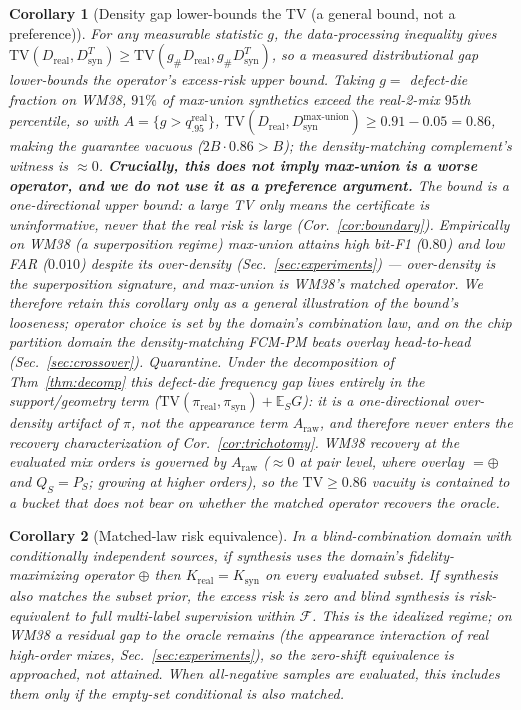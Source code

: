\documentclass[11pt]{article}
\newtheorem{corollary}{Corollary}
\begin{document}
\begin{corollary}[Density gap lower-bounds the TV (a general bound, not a
preference)]\label{cor:density}
For any measurable statistic $g$, the data-processing inequality gives
$\mathrm{TV}(D_{\mathrm{real}},D_{\mathrm{syn}}^{T})\ge
\mathrm{TV}(g_\#D_{\mathrm{real}},g_\#D_{\mathrm{syn}}^{T})$, so a measured
distributional gap \emph{lower-bounds} the operator's excess-risk \emph{upper
bound}. Taking $g=$ defect-die fraction on WM38, $91\%$ of max-union synthetics
exceed the real-2-mix $95$th percentile, so with $A=\{g>q^{\mathrm{real}}_{.95}\}$,
$\mathrm{TV}(D_{\mathrm{real}},D_{\mathrm{syn}}^{\text{max-union}})\ge
0.91-0.05=0.86$, making the guarantee vacuous ($2B\cdot0.86>B$); the density-matching
complement's witness is $\approx0$. \textbf{Crucially, this does \emph{not} imply
max-union is a worse operator, and we do not use it as a preference argument.} The
bound is a one-directional \emph{upper} bound: a large TV only means the certificate is
uninformative, never that the real risk is large (Cor.~\ref{cor:boundary}). Empirically
on WM38 (a superposition regime) max-union attains high bit-F1 ($0.80$) and low FAR
($0.010$) despite its over-density (Sec.~\ref{sec:experiments}) --- over-density is the
superposition signature, and max-union is WM38's matched operator. We therefore retain
this corollary only as a general illustration of the bound's looseness; operator choice
is set by the domain's combination law, and on the chip partition domain the
density-matching FCM-PM beats overlay head-to-head (Sec.~\ref{sec:crossover}).
\emph{Quarantine.} Under the decomposition of Thm~\ref{thm:decomp} this defect-die
\emph{frequency} gap lives entirely in the support/geometry term
($\mathrm{TV}(\pi_{\mathrm{real}},\pi_{\mathrm{syn}})+\mathbb{E}_S G$): it is a one-directional
over-density artifact of $\pi$, not the appearance term $A_{\mathrm{raw}}$, and therefore
\emph{never enters the recovery characterization} of Cor.~\ref{cor:trichotomy}. WM38 recovery
at the evaluated mix orders is governed by $A_{\mathrm{raw}}$ (${\approx}0$ at pair level, where
overlay $=\oplus$ and $Q_S=P_S$; growing at higher orders), so the $\mathrm{TV}\ge0.86$ vacuity
is contained to a bucket that does not bear on whether the matched operator recovers the oracle.
\end{corollary}

\begin{corollary}[Matched-law risk equivalence]\label{cor:noadv}
In a blind-combination domain with conditionally independent sources, if
synthesis uses the domain's fidelity-maximizing operator $\oplus$ then
$K_{\mathrm{real}}=K_{\mathrm{syn}}$ on every evaluated subset. If synthesis also
matches the subset prior, the excess risk is zero and blind synthesis is
risk-equivalent to full multi-label supervision within $\mathcal F$. This is the
idealized regime; on WM38 a residual gap to the oracle remains (the appearance
interaction of real high-order mixes, Sec.~\ref{sec:experiments}), so the
zero-shift equivalence is approached, not attained. When all-negative samples are
evaluated, this includes them only if the empty-set conditional is also matched.
\end{corollary}
\end{document}
